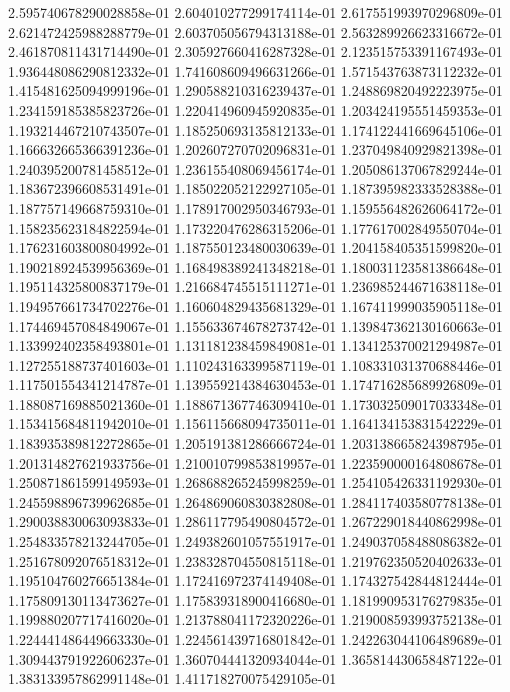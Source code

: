 2.595740678290028858e-01
2.604010277299174114e-01
2.617551993970296809e-01
2.621472425988288779e-01
2.603705056794313188e-01
2.563289926623316672e-01
2.461870811431714490e-01
2.305927660416287328e-01
2.123515753391167493e-01
1.936448086290812332e-01
1.741608609496631266e-01
1.571543763873112232e-01
1.415481625094999196e-01
1.290588210316239437e-01
1.248869820492223975e-01
1.234159185385823726e-01
1.220414960945920835e-01
1.203424195551459353e-01
1.193214467210743507e-01
1.185250693135812133e-01
1.174122441669645106e-01
1.166632665366391236e-01
1.202607270702096831e-01
1.237049840929821398e-01
1.240395200781458512e-01
1.236155408069456174e-01
1.205086137067829244e-01
1.183672396608531491e-01
1.185022052122927105e-01
1.187395982333528388e-01
1.187757149668759310e-01
1.178917002950346793e-01
1.159556482626064172e-01
1.158235623184822594e-01
1.173220476286315206e-01
1.177617002849550704e-01
1.176231603800804992e-01
1.187550123480030639e-01
1.204158405351599820e-01
1.190218924539956369e-01
1.168498389241348218e-01
1.180031123581386648e-01
1.195114325800837179e-01
1.216684745515111271e-01
1.236985244671638118e-01
1.194957661734702276e-01
1.160604829435681329e-01
1.167411999035905118e-01
1.174469457084849067e-01
1.155633674678273742e-01
1.139847362130160663e-01
1.133992402358493801e-01
1.131181238459849081e-01
1.134125370021294987e-01
1.127255188737401603e-01
1.110243163399587119e-01
1.108331031370688446e-01
1.117501554341214787e-01
1.139559214384630453e-01
1.174716285689926809e-01
1.188087169885021360e-01
1.188671367746309410e-01
1.173032509017033348e-01
1.153415684811942010e-01
1.156115668094735011e-01
1.164134153831542229e-01
1.183935389812272865e-01
1.205191381286666724e-01
1.203138665824398795e-01
1.201314827621933756e-01
1.210010799853819957e-01
1.223590000164808678e-01
1.250871861599149593e-01
1.268688265245998259e-01
1.254105426331192930e-01
1.245598896739962685e-01
1.264869060830382808e-01
1.284117403580778138e-01
1.290038830063093833e-01
1.286117795490804572e-01
1.267229018440862998e-01
1.254833578213244705e-01
1.249382601057551917e-01
1.249037058488086382e-01
1.251678092076518312e-01
1.238328704550815118e-01
1.219762350520402633e-01
1.195104760276651384e-01
1.172416972374149408e-01
1.174327542844812444e-01
1.175809130113473627e-01
1.175839318900416680e-01
1.181990953176279835e-01
1.199880207717416020e-01
1.213788041172320226e-01
1.219008593993752138e-01
1.224441486449663330e-01
1.224561439716801842e-01
1.242263044106489689e-01
1.309443791922606237e-01
1.360704441320934044e-01
1.365814430658487122e-01
1.383133957862991148e-01
1.411718270075429105e-01

